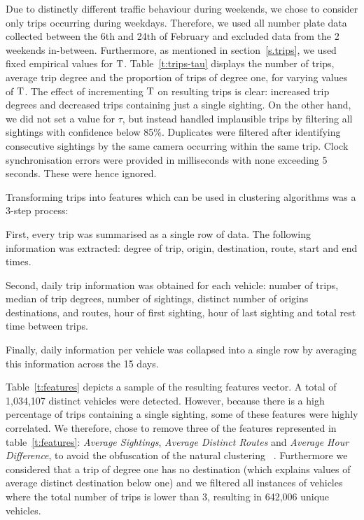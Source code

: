 Due to distinctly different traffic behaviour during weekends, we chose to consider only trips occurring during weekdays. Therefore, we used all number plate data collected between the 6th and 24th of February and excluded data from the 2 weekends in-between. Furthermore, as mentioned in section~\ref{s.trips}, we used fixed empirical values for $\mathrm{T}$. Table~\ref{t:trips-tau} displays the number of trips, average trip degree and the proportion of trips of degree one, for varying values of $\mathrm{T}$. The effect of incrementing $\mathrm{T}$ on resulting trips is clear: increased trip degrees and decreased trips containing just a single sighting. On the other hand, we did not set a value for $\tau$, but instead handled implausible trips by filtering all sightings with confidence below 85\%. Duplicates were filtered after identifying consecutive sightings by the same camera occurring within the same trip. Clock synchronisation errors were provided in milliseconds with none exceeding 5 seconds. These were hence ignored.

Transforming trips into features which can be used in clustering algorithms was a 3-step process:
\begin{enumerate*}[label=(\roman*)]
  \item First, every trip was summarised as a single row of data. The following information was extracted: degree of trip, origin, destination, route, start and end times.
  \item Second, daily trip information was obtained for each vehicle: number of trips, median of trip degrees, number of sightings, distinct number of origins destinations, and routes, hour of first sighting, hour of last sighting and total rest time between trips.
  \item Finally, daily information per vehicle was collapsed into a single row by averaging this information across the 15 days.
\end{enumerate*}

Table~\ref{t:features} depicts a sample of the resulting features vector. A total of 1,034,107 distinct vehicles were detected. However, because there is a high percentage of trips containing a single sighting, some of these features were highly correlated. We therefore, chose to remove three of the features represented in table~\ref{t:features}: \emph{Average Sightings}, \emph{Average Distinct Routes} and \emph{Average Hour Difference}, to avoid the obfuscation of the natural clustering ~\cite{Kmeans}. Furthermore we considered that a trip of degree one has no destination (which explains values of average distinct destination below one) and we filtered all instances of vehicles where the total number of trips is lower than 3, resulting in 642,006 unique vehicles.

